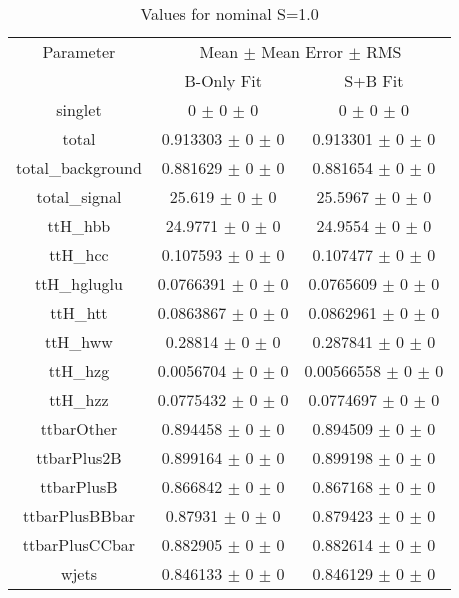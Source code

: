 \begin{table}
\centering
\caption{Values for nominal S=1.0}
\begin{tabular}{ccc}
\toprule
Parameter 	& \multicolumn{2}{c}{Mean $\pm$ Mean Error $\pm$ RMS}\\
 	& B-Only Fit & S+B Fit\\
\midrule
singlet 	& \num{0} $\pm$ \num{0} $\pm$ \num{0} 	& \num{0} $\pm$ \num{0} $\pm$ \num{0}\\
total 	& \num{0.913303} $\pm$ \num{0} $\pm$ \num{0} 	& \num{0.913301} $\pm$ \num{0} $\pm$ \num{0}\\
total\_background 	& \num{0.881629} $\pm$ \num{0} $\pm$ \num{0} 	& \num{0.881654} $\pm$ \num{0} $\pm$ \num{0}\\
total\_signal 	& \num{25.619} $\pm$ \num{0} $\pm$ \num{0} 	& \num{25.5967} $\pm$ \num{0} $\pm$ \num{0}\\
ttH\_hbb 	& \num{24.9771} $\pm$ \num{0} $\pm$ \num{0} 	& \num{24.9554} $\pm$ \num{0} $\pm$ \num{0}\\
ttH\_hcc 	& \num{0.107593} $\pm$ \num{0} $\pm$ \num{0} 	& \num{0.107477} $\pm$ \num{0} $\pm$ \num{0}\\
ttH\_hgluglu 	& \num{0.0766391} $\pm$ \num{0} $\pm$ \num{0} 	& \num{0.0765609} $\pm$ \num{0} $\pm$ \num{0}\\
ttH\_htt 	& \num{0.0863867} $\pm$ \num{0} $\pm$ \num{0} 	& \num{0.0862961} $\pm$ \num{0} $\pm$ \num{0}\\
ttH\_hww 	& \num{0.28814} $\pm$ \num{0} $\pm$ \num{0} 	& \num{0.287841} $\pm$ \num{0} $\pm$ \num{0}\\
ttH\_hzg 	& \num{0.0056704} $\pm$ \num{0} $\pm$ \num{0} 	& \num{0.00566558} $\pm$ \num{0} $\pm$ \num{0}\\
ttH\_hzz 	& \num{0.0775432} $\pm$ \num{0} $\pm$ \num{0} 	& \num{0.0774697} $\pm$ \num{0} $\pm$ \num{0}\\
ttbarOther 	& \num{0.894458} $\pm$ \num{0} $\pm$ \num{0} 	& \num{0.894509} $\pm$ \num{0} $\pm$ \num{0}\\
ttbarPlus2B 	& \num{0.899164} $\pm$ \num{0} $\pm$ \num{0} 	& \num{0.899198} $\pm$ \num{0} $\pm$ \num{0}\\
ttbarPlusB 	& \num{0.866842} $\pm$ \num{0} $\pm$ \num{0} 	& \num{0.867168} $\pm$ \num{0} $\pm$ \num{0}\\
ttbarPlusBBbar 	& \num{0.87931} $\pm$ \num{0} $\pm$ \num{0} 	& \num{0.879423} $\pm$ \num{0} $\pm$ \num{0}\\
ttbarPlusCCbar 	& \num{0.882905} $\pm$ \num{0} $\pm$ \num{0} 	& \num{0.882614} $\pm$ \num{0} $\pm$ \num{0}\\
wjets 	& \num{0.846133} $\pm$ \num{0} $\pm$ \num{0} 	& \num{0.846129} $\pm$ \num{0} $\pm$ \num{0}\\
\bottomrule
\end{tabular}
\end{table}